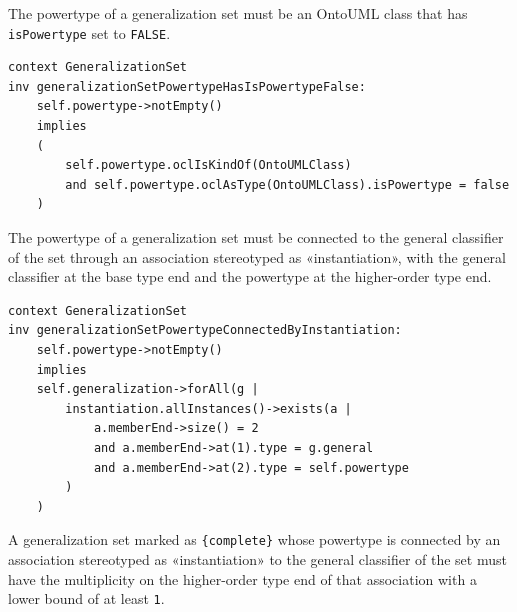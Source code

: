 \begin{constraint}
\label{constraint:generalizationSetPowertypeHasIsPowertypeFalse}
The powertype of a generalization set must be an OntoUML class that has \texttt{isPowertype} set to \texttt{FALSE}.

\begin{lstlisting}[language=OCL]
context GeneralizationSet
inv generalizationSetPowertypeHasIsPowertypeFalse:
    self.powertype->notEmpty()
    implies
    (
        self.powertype.oclIsKindOf(OntoUMLClass)
        and self.powertype.oclAsType(OntoUMLClass).isPowertype = false
    )
\end{lstlisting}
\end{constraint}

\begin{constraint}
\label{constraint:generalizationSetPowertypeConnectedByInstantiation}
The powertype of a generalization set must be connected to the general classifier of the set through an association stereotyped as «instantiation», with the general classifier at the base type end and the powertype at the higher-order type end.

\begin{lstlisting}[language=OCL]
context GeneralizationSet
inv generalizationSetPowertypeConnectedByInstantiation:
    self.powertype->notEmpty()
    implies
    self.generalization->forAll(g |
        instantiation.allInstances()->exists(a |
            a.memberEnd->size() = 2
            and a.memberEnd->at(1).type = g.general
            and a.memberEnd->at(2).type = self.powertype
        )
    )
\end{lstlisting}
\end{constraint}

\begin{constraint}
\label{constraint:completeGeneralizationSetRequiresMandatoryInstantiation}
A generalization set marked as \texttt{\{complete\}} whose powertype is connected by an association stereotyped as «instantiation» to the general classifier of the set must have the multiplicity on the higher-order type end of that association with a lower bound of at least \texttt{1}. %

\end{constraint}

